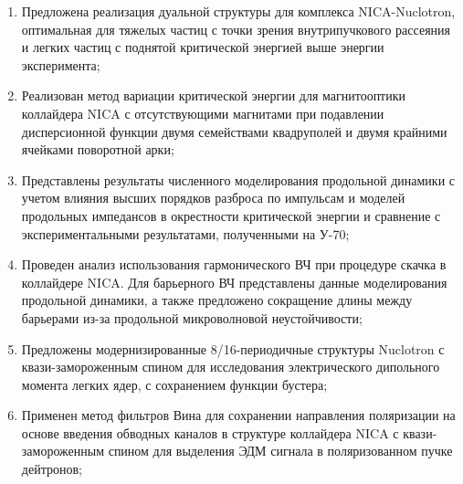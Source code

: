 \par {}
\begin{enumerate}[beginpenalty=10000] %
	\item 	Предложена реализация дуальной структуры для комплекса NICA-Nuclotron, оптимальная для тяжелых частиц с точки зрения внутрипучкового рассеяния и легких частиц с поднятой критической энергией выше энергии эксперимента; \autocite{Kolokolchikov:2025_dual, Syresin:2021_polar}
	\item	Реализован метод вариации критической энергии для магнитооптики коллайдера NICA с отсутствующими магнитами при подавлении дисперсионной функции двумя семействами квадруполей и двумя крайними ячейками поворотной арки; \autocite{Kolokolchikov:2021trans, Kolokolchikov:2023_pecular}
	\item	Представлены результаты численного моделирования продольной динамики с учетом влияния высших порядков разброса по импульсам и моделей продольных импедансов в окрестности критической энергии и сравнение с экспериментальными результатами, полученными на У-70; \autocite{Kolokolchikov:2025_U70, Kolokolchikov:2025_jump}
	\item 	Проведен анализ использования гармонического ВЧ при процедуре скачка в коллайдере NICA. Для барьерного ВЧ представлены данные моделирования продольной динамики, а также предложено сокращение длины между барьерами из-за продольной микроволновой неустойчивости; \autocite{Kolokolchikov:2024_bb_rupac, Kolokolchikov:2023_bb_IPAC, Kolokolchikov:2024_bb_dspin}
	\item	Предложены модернизированные 8/16-периодичные структуры Nuclotron с квази-замороженным спином для исследования электрического дипольного момента легких ядер, с сохранением функции бустера; \autocite{Senichev:2023_QFS, Senichev:2023_nuclotron, Kolokolchikov:2025_nuclotron}
	\item	Применен метод фильтров Вина для сохранении направления поляризации на основе введения обводных каналов в структуре коллайдера NICA с квази-замороженным спином для выделения ЭДМ сигнала в поляризованном пучке дейтронов; \autocite{Kolokolchikov:2023_bypass_ru, Kolokolchikov:2023_bypass_IPAC, Senichev:2024_nica_edm, Kolokolchikov:2023_sc, Kolokolchikov:2023_sc_IPAC}
\end{enumerate}

